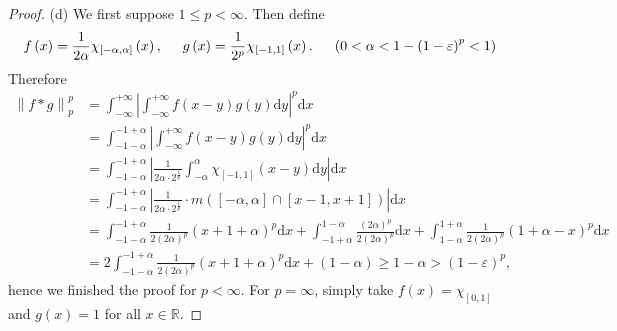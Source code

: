 \begin{proof}
(d) We first suppose $1\le p<\infty$. Then define 
$$
f\left( x \right) =\frac{1}{2\alpha}\chi _{\left[ -\alpha ,\alpha \right]}\left( x \right) ,\hspace{0.5cm}g\left( x \right) =\frac{1}{2^p}\chi _{\left[ -1,1 \right]}\left( x \right) .\hspace{0.5cm}\left( 0<\alpha <1-\left( 1-\varepsilon \right) ^p<1 \right) 
$$
Therefore 
$$
\begin{aligned}
\left\| f*g \right\| _{p}^{p}&=\int_{-\infty}^{+\infty}{\left| \int_{-\infty}^{+\infty}{f\left( x-y \right) g\left( y \right) \mathrm{d}y} \right|^p\mathrm{d}x}
\\
&=\int_{-1-\alpha}^{-1+\alpha}{\left| \int_{-\infty}^{+\infty}{f\left( x-y \right) g\left( y \right) \mathrm{d}y} \right|^p\mathrm{d}x}
\\
&=\int_{-1-\alpha}^{-1+\alpha}{\left| \frac{1}{2\alpha \cdot 2^{\frac{1}{p}}}\int_{-\alpha}^{\alpha}{\chi _{\left[ -1,1 \right]}\left( x-y \right) \mathrm{d}y} \right|\mathrm{d}x}
\\
&=\int_{-1-\alpha}^{-1+\alpha}{\left| \frac{1}{2\alpha \cdot 2^{\frac{1}{p}}}\cdot m\left( \left[ -\alpha ,\alpha \right] \cap \left[ x-1,x+1 \right] \right) \right|\mathrm{d}x}
\\
&=\int_{-1-\alpha}^{-1+\alpha}{\frac{1}{2\left( 2\alpha \right) ^p}\left( x+1+\alpha \right) ^p\mathrm{d}x}+\int_{-1+\alpha}^{1-\alpha}{\frac{\left( 2\alpha \right) ^p}{2\left( 2\alpha \right) ^p}\mathrm{d}x}+\int_{1-\alpha}^{1+\alpha}{\frac{1}{2\left( 2\alpha \right) ^p}\left( 1+\alpha -x \right) ^p\mathrm{d}x}
\\
&=2\int_{-1-\alpha}^{-1+\alpha}{\frac{1}{2\left( 2\alpha \right) ^p}\left( x+1+\alpha \right) ^p\mathrm{d}x}+\left( 1-\alpha \right) \ge 1-\alpha >\left( 1-\varepsilon \right) ^p,
\end{aligned}
$$
hence we finished the proof for $p<\infty$. For $p=\infty$, simply take $f(x)=\chi_{[0,1]}$ and $g(x)=1$ for all $x\in\mathbb{R}$.
\end{proof}
